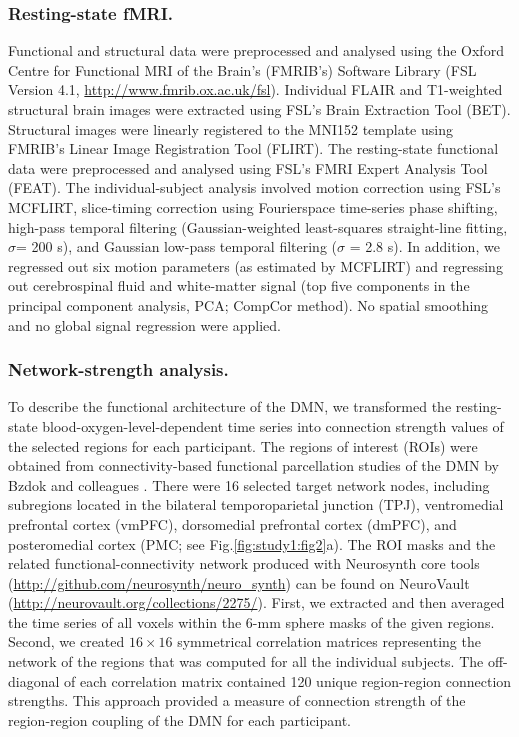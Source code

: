 \subsubsection{Resting-state fMRI.}

Functional and structural data were preprocessed and analysed using the Oxford Centre for Functional MRI of the Brain’s (FMRIB’s) Software Library (FSL Version 4.1, \url{http://www.fmrib.ox.ac.uk/fsl}).
Individual FLAIR and T1-weighted structural brain images were extracted using FSL’s Brain Extraction Tool (BET). Structural images were linearly registered to the MNI152 template using FMRIB’s Linear Image Registration Tool (FLIRT). The resting-state functional data were preprocessed and analysed using FSL's FMRI Expert Analysis Tool (FEAT). The individual-subject analysis involved motion correction using FSL’s MCFLIRT, slice-timing correction using Fourierspace time-series phase shifting, high-pass temporal filtering (Gaussian-weighted least-squares straight-line fitting, \(\sigma\)= 200 s), and Gaussian low-pass temporal filtering (\(\sigma\) = 2.8 s). In addition, we regressed out six motion parameters (as estimated by MCFLIRT) and regressing out cerebrospinal fluid and white-matter signal (top five components in the principal component analysis, PCA; CompCor method). No spatial smoothing and no global signal regression were applied.

\subsubsection{Network-strength analysis.}

To describe the functional architecture of the DMN, we transformed the resting-state blood-oxygen-level-dependent time series into connection strength values of the selected regions for each participant. The regions of interest (ROIs) were obtained from connectivity-based functional parcellation studies of the DMN by Bzdok and colleagues
\cite{BzdokNI2013,Bzdok2015,Bzdok2016,Eickhoff2016,Eickhoff2016}.
There were 16 selected target network nodes, including subregions located in the bilateral temporoparietal junction (TPJ), ventromedial prefrontal cortex (vmPFC), dorsomedial prefrontal cortex (dmPFC), and posteromedial cortex
(PMC; see Fig.\ref{fig:study1:fig2}a).
The ROI masks and the related functional-connectivity network produced with Neurosynth core tools
(\url{http://github.com/neurosynth/neuro_synth})
can be found on NeuroVault
(\url{http://neurovault.org/collections/2275/}). First, we extracted and then averaged the time series of all voxels within the 6-mm sphere masks of the given regions. Second, we created \(16\times16\) symmetrical correlation matrices representing the network of the regions that was computed for all the individual subjects. The off-diagonal of each correlation matrix contained 120 unique region-region connection strengths. This approach provided a measure of connection strength of the region-region coupling of the DMN for each participant.

